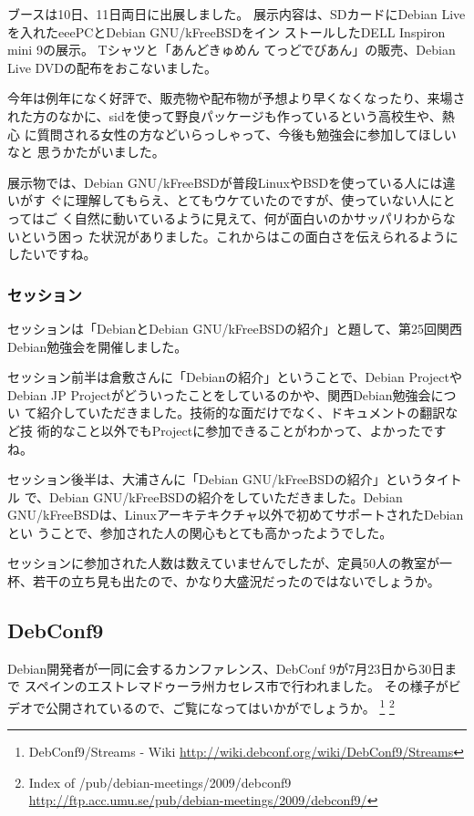 \documentclass[mingoth,a4paper]{jsarticle}
\begin{document}
ブースは10日、11日両日に出展しました。
展示内容は、SDカードにDebian Liveを入れたeeePCとDebian GNU/kFreeBSDをイン
ストールしたDELL Inspiron mini 9の展示。 Tシャツと「あんどきゅめん
てっどでびあん」の販売、Debian Live DVDの配布をおこないました。

今年は例年になく好評で、販売物や配布物が予想より早くなくなったり、来場さ
れた方のなかに、sidを使って野良パッケージも作っているという高校生や、熱心
に質問される女性の方などいらっしゃって、今後も勉強会に参加してほしいなと
思うかたがいました。

展示物では、Debian GNU/kFreeBSDが普段LinuxやBSDを使っている人には違いがす
ぐに理解してもらえ、とてもウケていたのですが、使っていない人にとってはご
く自然に動いているように見えて、何が面白いのかサッパリわからないという困っ
た状況がありました。これからはこの面白さを伝えられるようにしたいですね。

\subsubsection{セッション}
セッションは「DebianとDebian GNU/kFreeBSDの紹介」と題して、第25回関西
Debian勉強会を開催しました。

セッション前半は倉敷さんに「Debianの紹介」ということで、Debian Projectや
Debian JP Projectがどういったことをしているのかや、関西Debian勉強会につい
て紹介していただきました。技術的な面だけでなく、ドキュメントの翻訳など技
術的なこと以外でもProjectに参加できることがわかって、よかったですね。

セッション後半は、大浦さんに「Debian GNU/kFreeBSDの紹介」というタイトル
で、Debian GNU/kFreeBSDの紹介をしていただきました。Debian
GNU/kFreeBSDは、Linuxアーキテキクチャ以外で初めてサポートされたDebianとい
うことで、参加された人の関心もとても高かったようでした。

セッションに参加された人数は数えていませんでしたが、定員50人の教室が一
杯、若干の立ち見も出たので、かなり大盛況だったのではないでしょうか。

\subsection{DebConf9}
Debian開発者が一同に会するカンファレンス、DebConf 9が7月23日から30日まで
スペインのエストレマドゥーラ州カセレス市で行われました。
その様子がビデオで公開されているので、ご覧になってはいかがでしょうか。
\footnote{DebConf9/Streams - Wiki \url{http://wiki.debconf.org/wiki/DebConf9/Streams}}
\footnote{Index of /pub/debian-meetings/2009/debconf9 \url{http://ftp.acc.umu.se/pub/debian-meetings/2009/debconf9/}}
\end{document}
